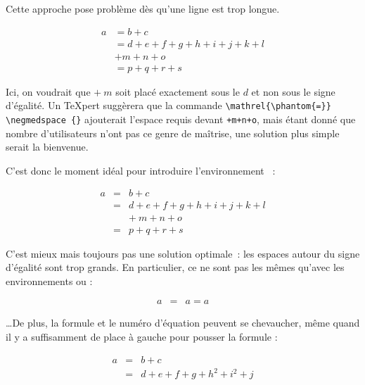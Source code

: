 Cette approche pose problème dès qu'une ligne est trop longue.
\begin{example}
\begin{align}
  a & = b + c \\
  & = d + e + f + g + h + i 
  + j + k + l \nonumber \\
  & + m + n + o \\
  & = p + q + r + s
\end{align}
\end{example}
\noindent
Ici, on voudrait que $+\: m$ soit placé exactement sous le $d$ et non sous le
signe d'égalité. Un \TeX{}pert suggèrera que la commande
\verb+\mathrel{\phantom{=}} \negmedspace {}+ ajouterait l'espace
requis devant \verb|+m+n+o|, mais étant donné que nombre
d'utilisateurs n'ont pas ce genre de maîtrise, une solution plus
simple serait la bienvenue.

C'est donc le moment idéal pour introduire l'environnement
~:
\begin{example}
\begin{eqnarray}
  a & = & b + c \\
  & = & d + e + f + g + h + i 
  + j + k + l \nonumber \\
  && +\: m + n + o \\
  & = & p + q + r + s
\end{eqnarray}
\end{example}

C'est mieux mais toujours pas une solution optimale~: les
espaces autour du signe d'égalité sont trop grands. En particulier, ce
ne sont pas les mêmes qu'avec les environnements  ou
 :
\begin{example}
\begin{eqnarray}
  a & = & a = a
\end{eqnarray}
\end{example}

\noindent \dots De plus, la formule et le numéro d'équation peuvent se
chevaucher, même quand il y a suffisamment de place à gauche pour
pousser la formule :
\begin{example}
\begin{eqnarray}
  a & = & b + c 
  \\
  & = & d + e + f + g + h^2 
  + i^2 + j 
  \label{eq:eqnarrayfautif}
\end{eqnarray}
\end{example}

